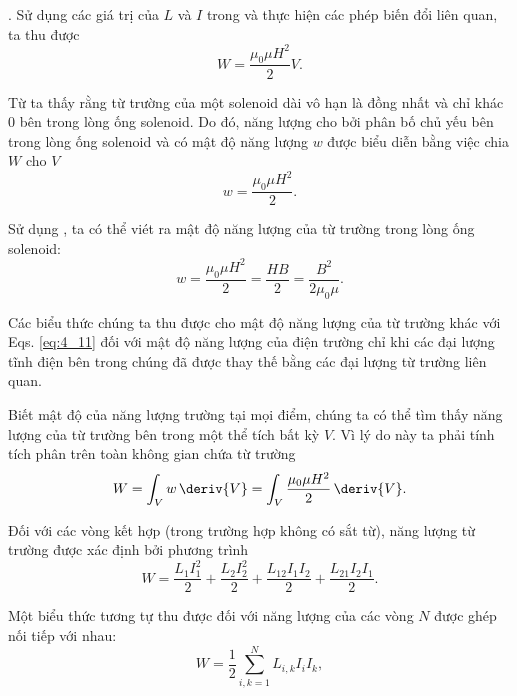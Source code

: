 .
Sử dụng các giá trị của $L$ và $I$ trong  và thực hiện các phép biến đổi liên quan, ta thu được
\begin{equation}\label{eq:8_39}
	W = \frac{\mu_0 \mu H^2}{2} V.
\end{equation}

Từ  ta thấy rằng từ trường của một solenoid dài vô hạn là đồng nhất và chỉ khác 0 bên trong lòng ống solenoid.
Do đó, năng lượng cho bởi  phân bố chủ yếu bên trong lòng ống solenoid và có mật độ năng lượng $w$ được biểu diễn bằng việc chia $W$ cho $V$
\begin{equation}\label{eq:8_40}
	w = \frac{\mu_0 \mu H^2}{2}.
\end{equation}

\noindent
Sử dụng , ta có thể viét ra mật độ năng lượng của từ trường trong lòng ống solenoid:
\begin{equation}\label{eq:8_41}
	w = \frac{\mu_0 \mu H^2}{2} = \frac{HB}{2} = \frac{B^2}{2 \mu_0 \mu}.
\end{equation}

Các biểu thức chúng ta thu được cho mật độ năng lượng của từ trường khác với Eqs. \eqref{eq:4_11} đối với mật độ năng lượng của điện trường chỉ khi các đại lượng tĩnh điện bên trong chúng đã được thay thế bằng các đại lượng từ trường liên quan.

Biết mật độ của năng lượng trường tại mọi điểm, chúng ta có thể tìm thấy năng lượng của từ trường bên trong một thể tích bất kỳ $V$.
Vì lý do này ta phải tính tích phân trên toàn không gian chứa từ trường
\begin{equation}\label{eq:8_42}
	W = \int_V w\, \deriv{V} = \int_V \frac{\mu_0 \mu H^2}{2}\, \deriv{V}.
\end{equation}

Đối với các vòng kết hợp (trong trường hợp không có sắt từ), năng lượng từ trường được xác định bởi phương trình
\begin{equation}\label{eq:8_43}
	W = \frac{L_1 I_1^2}{2} + \frac{L_2 I_2^2}{2} + \frac{L_{12} I_1 I_2}{2} + \frac{L_{21} I_2 I_1}{2}.
\end{equation}

\noindent
Một biểu thức tương tự thu được đối với năng lượng của các vòng $N$ được ghép nối tiếp với nhau:
\begin{equation}\label{eq:8_44}
	W = \frac{1}{2} \sum_{i,k=1}^N L_{i,k} I_i I_k,
\end{equation}

